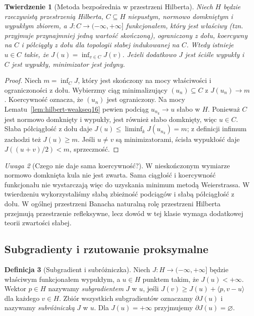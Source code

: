 \documentclass[11pt,a4paper]{article}
\numberwithin{equation}{section}
\theoremstyle{plain}
\newtheorem{twierdzenie}{Twierdzenie}[section]
\theoremstyle{definition}
\newtheorem{definicja}[twierdzenie]{Definicja}
\theoremstyle{remark}
\newtheorem{uwaga}[twierdzenie]{Uwaga}
\begin{document}
\begin{twierdzenie}[Metoda bezpośrednia w przestrzeni Hilberta]
\label{thm:direct-method16}
Niech $H$ będzie rzeczywistą przestrzenią Hilberta,
$C\subseteq H$ niepustym, normowo domkniętym i wypukłym
zbiorem, a $J:C\to(-\infty,+\infty]$ funkcjonałem,
który jest właściwy (tzn. przyjmuje przynajmniej jedną
wartość skończoną), ograniczony z dołu, koercywny na $C$
i półciągły z dołu dla topologii słabej indukowanej na $C$.
Wtedy istnieje $u\in C$ takie, że
$J(u)=\inf_{v\in C}J(v)$.
Jeżeli dodatkowo $J$ jest ściśle wypukły i $C$ jest wypukły,
minimizator jest jedyny.
\end{twierdzenie}
\begin{proof}
Niech $m=\inf_C J$, który jest skończony na mocy
właściwości i ograniczoności z dołu. Wybierzmy
ciąg minimalizujący $(u_n)\subseteq C$ z $J(u_n)\to m$.
Koercywność oznacza, że $(u_n)$ jest ograniczony.
Na mocy Lematu~\ref{lem:hilbert-weakseq16}
pewien podciąg $u_{n_k}\to u$ słabo w $H$.
Ponieważ $C$ jest normowo domknięty i wypukły,
jest również słabo domknięty, więc $u\in C$.
Słaba półciągłość z dołu daje
$J(u)\le\liminf_k J(u_{n_k})=m$; z definicji infimum
zachodzi też $J(u)\ge m$. Jeśli $u\ne v$ są minimizatorami,
ścisła wypukłość daje $J((u+v)/2)<m$, sprzeczność.
\end{proof}

\begin{uwaga}[Czego nie daje sama koercywność?]
\label{rem:coercive16}
W nieskończonym wymiarze normowo domknięta kula
nie jest zwarta. Sama ciągłość i koercywność funkcjonału
nie wystarczają więc do uzyskania minimum metodą
Weierstrassa. W twierdzeniu wykorzystaliśmy
słabą zbieżność podciągów i słabą półciągłość z dołu.
W ogólnej przestrzeni Banacha naturalną rolę przestrzeni
Hilberta przejmują przestrzenie refleksywne, lecz dowód
w tej klasie wymaga dodatkowej teorii zwartości słabej.
\end{uwaga}

\subsection{Subgradienty i rzutowanie proksymalne}

\begin{definicja}[Subgradient i subróżniczka]
\label{def:subgrad16}
Niech $J:H\to(-\infty,+\infty]$ będzie właściwym
funkcjonałem wypukłym, a $u\in H$ punktem takim,
że $J(u)<+\infty$. Wektor $p\in H$ nazywamy
\emph{subgradientem} $J$ w $u$, jeśli
$J(v)\ge J(u)+\langle p,v-u\rangle$ dla każdego $v\in H$.
Zbiór wszystkich subgradientów oznaczamy $\partial J(u)$
i nazywamy \emph{subróżniczką} $J$ w $u$.
Dla $J(u)=+\infty$ przyjmujemy $\partial J(u)=\varnothing$.
\end{definicja}
\end{document}
